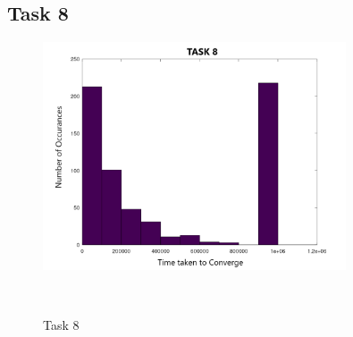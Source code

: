 \documentclass[answers]{exam}
\begin{document}
\subsection{Task 8}
    \begin{figure}[H]
        \centering
        \includegraphics[width = 0.8\textwidth]{Graphs/task8.png}
        \caption{Task 8}
        \label{fig:task8}\\
    \end{figure}
    
\end{document}
